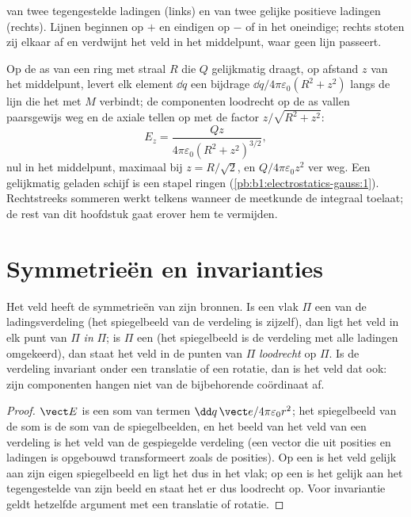 \begin{omfigure}
{\small {} van twee tegengestelde ladingen (links) en van twee gelijke
positieve ladingen (rechts). Lijnen beginnen op $+$ en eindigen op $-$ of in
het oneindige; rechts stoten zij elkaar af en verdwijnt het veld in
het middelpunt, waar geen lijn passeert.}
\end{omfigure}

\begin{example}\label{ex:b1:electrostatics-gauss:ring}
Op de as van een ring met straal $R$ die $Q$ gelijkmatig draagt, op afstand
$z$ van het middelpunt, levert elk element $\dd q$ een bijdrage $\dd q/4\pi\varepsilon_0(R^2 +
z^2)$ langs de lijn die het met $M$ verbindt; de componenten loodrecht
op de as vallen paarsgewijs weg en de axiale tellen op met de factor
$z/\sqrt{R^2 + z^2}$:
\[
E_z = \frac{Qz}{4\pi\varepsilon_0(R^2 + z^2)^{3/2}} ,
\]
nul in het middelpunt, maximaal bij $z = R/\sqrt2$, en $Q/4\pi\varepsilon_0z^2$ ver
weg. Een gelijkmatig geladen schijf is een stapel ringen (\cref{pb:b1:electrostatics-gauss:1}).
Rechtstreeks sommeren werkt telkens wanneer de meetkunde de integraal toelaat; de
rest van dit hoofdstuk gaat erover hem te vermijden.
\end{example}

\section{Symmetrieën en invarianties}

\begin{proposition}[Symmetriebeginsel]\label{prop:b1:electrostatics-gauss:symmetry}
Het veld heeft de symmetrieën van zijn bronnen. Is een vlak $\Pi$ een
\emph{} van de ladingsverdeling (het spiegelbeeld
van de verdeling is zijzelf), dan ligt het veld in elk punt van $\Pi$
\emph{in} $\Pi$; is $\Pi$ een \emph{}
(het spiegelbeeld is de verdeling met alle ladingen omgekeerd), dan staat het
veld in de punten van $\Pi$ \emph{loodrecht} op $\Pi$. Is de
verdeling invariant onder een translatie of een rotatie, dan is het veld dat ook:
zijn componenten hangen niet van de bijbehorende coördinaat af.
\end{proposition}

\begin{proof}
$\vect E$ is een som van termen $\dd q\,\vect e/4\pi\varepsilon_0r^2$; het spiegelbeeld
van de som is de som van de spiegelbeelden, en het beeld van het veld
van een verdeling is het veld van de gespiegelde verdeling (een vector die
uit posities en ladingen is opgebouwd transformeert zoals de posities). Op een
 is het veld gelijk aan zijn eigen spiegelbeeld en ligt het dus in het
vlak; op een  is het gelijk aan het tegengestelde van zijn beeld en
staat het er dus loodrecht op. Voor invariantie geldt hetzelfde argument met een
translatie of rotatie.
\end{proof}

